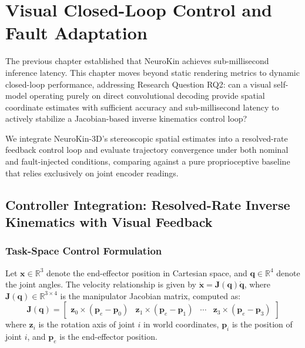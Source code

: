 \documentclass[12pt,a4paper,oneside]{report}
\begin{document}
\chapter{Visual Closed-Loop Control and Fault Adaptation}
\label{chap:closed_loop_fault_adaptation}

The previous chapter established that NeuroKin achieves sub-millisecond inference latency. This chapter moves beyond static rendering metrics to dynamic closed-loop performance, addressing Research Question RQ2: can a visual self-model operating purely on direct convolutional decoding provide spatial coordinate estimates with sufficient accuracy and sub-millisecond latency to actively stabilize a Jacobian-based inverse kinematics control loop?

We integrate NeuroKin-3D's stereoscopic spatial estimates into a resolved-rate feedback control loop and evaluate trajectory convergence under both nominal and fault-injected conditions, comparing against a pure proprioceptive baseline that relies exclusively on joint encoder readings.

\section{Controller Integration: Resolved-Rate Inverse Kinematics with Visual Feedback}
\label{sec:controller_integration}

\subsection{Task-Space Control Formulation}
Let $\mathbf{x} \in \mathbb{R}^3$ denote the end-effector position in Cartesian space, and $\mathbf{q} \in \mathbb{R}^4$ denote the joint angles. The velocity relationship is given by $\dot{\mathbf{x}} = \mathbf{J}(\mathbf{q}) \dot{\mathbf{q}}$, where $\mathbf{J}(\mathbf{q}) \in \mathbb{R}^{3 \times 4}$ is the manipulator Jacobian matrix, computed as:
\begin{equation}
\mathbf{J}(\mathbf{q}) = \begin{bmatrix}
\mathbf{z}_0 \times (\mathbf{p}_e - \mathbf{p}_0) & \mathbf{z}_1 \times (\mathbf{p}_e - \mathbf{p}_1) & \cdots & \mathbf{z}_3 \times (\mathbf{p}_e - \mathbf{p}_3)
\end{bmatrix}
\end{equation}
where $\mathbf{z}_i$ is the rotation axis of joint $i$ in world coordinates, $\mathbf{p}_i$ is the position of joint $i$, and $\mathbf{p}_e$ is the end-effector position.
\end{document}
